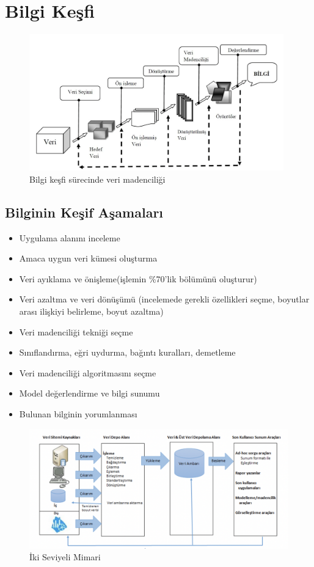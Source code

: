 \documentclass{article}
\begin{document}
\section{Bilgi Keşfi}
\begin{figure}[h]
\centering
  \includegraphics[width=11cm]{veri.png}
  \caption{Bilgi keşfi sürecinde veri madenciliği
 \cite{ref1}}
\end{figure}
\vspace{15pt}

\subsection{Bilginin Keşif Aşamaları}

\vspace{15pt}
\begin{itemize}
    \item Uygulama alanını inceleme 
    \item Amaca uygun veri kümesi oluşturma
    \item Veri ayıklama ve önişleme(işlemin \%70’lik bölümünü oluşturur)
    \item Veri azaltma ve veri dönüşümü (incelemede gerekli  özellikleri seçme, boyutlar arası ilişkiyi belirleme, boyut azaltma)
    \item Veri madenciliği tekniği seçme
    \item Sınıflandırma, eğri uydurma, bağıntı kuralları, demetleme
    \item Veri madenciliği algoritmasını seçme
    \item Model değerlendirme ve bilgi sunumu
    \item Bulunan bilginin yorumlanması
\end{itemize}

\begin{figure}[h]
\centering
  \includegraphics[width=15cm]{veriambar.png}
  \caption{İki Seviyeli Mimari
 \cite{ref2}}
\end{figure}
\end{document}
